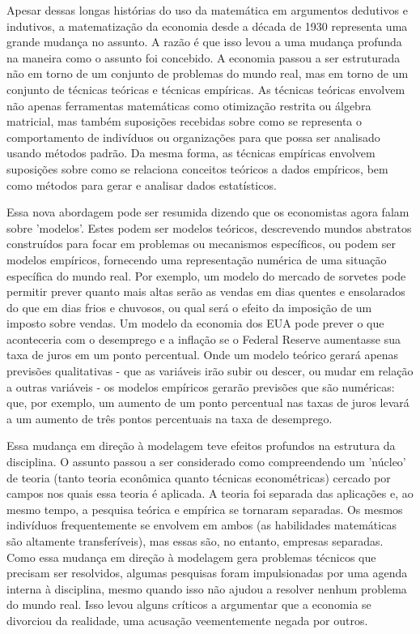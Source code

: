 \documentclass[12pt]{article}
\begin{document}
Apesar dessas longas histórias do uso da matemática em argumentos dedutivos e indutivos, a matematização da economia desde a década de 1930 representa uma grande mudança no assunto. A razão é que isso levou a uma mudança profunda na maneira como o assunto foi concebido. A economia passou a ser estruturada não em torno de um conjunto de problemas do mundo real, mas em torno de um conjunto de técnicas teóricas e técnicas empíricas. As técnicas teóricas envolvem não apenas ferramentas matemáticas como otimização restrita ou álgebra matricial, mas também suposições recebidas sobre como se representa o comportamento de indivíduos ou organizações para que possa ser analisado usando métodos padrão. Da mesma forma, as técnicas empíricas envolvem suposições sobre como se relaciona conceitos teóricos a dados empíricos, bem como métodos para gerar e analisar dados estatísticos.

Essa nova abordagem pode ser resumida dizendo que os economistas agora falam sobre 'modelos'. Estes podem ser modelos teóricos, descrevendo mundos abstratos construídos para focar em problemas ou mecanismos específicos, ou podem ser modelos empíricos, fornecendo uma representação numérica de uma situação específica do mundo real. Por exemplo, um modelo do mercado de sorvetes pode permitir prever quanto mais altas serão as vendas em dias quentes e ensolarados do que em dias frios e chuvosos, ou qual será o efeito da imposição de um imposto sobre vendas. Um modelo da economia dos EUA pode prever o que aconteceria com o desemprego e a inflação se o Federal Reserve aumentasse sua taxa de juros em um ponto percentual. Onde um modelo teórico gerará apenas previsões qualitativas - que as variáveis irão subir ou descer, ou mudar em relação a outras variáveis - os modelos empíricos gerarão previsões que são numéricas: que, por exemplo, um aumento de um ponto percentual nas taxas de juros levará a um aumento de três pontos percentuais na taxa de desemprego.

Essa mudança em direção à modelagem teve efeitos profundos na estrutura da disciplina. O assunto passou a ser considerado como compreendendo um 'núcleo' de teoria (tanto teoria econômica quanto técnicas econométricas) cercado por campos nos quais essa teoria é aplicada. A teoria foi separada das aplicações e, ao mesmo tempo, a pesquisa teórica e empírica se tornaram separadas. Os mesmos indivíduos frequentemente se envolvem em ambos (as habilidades matemáticas são altamente transferíveis), mas essas são, no entanto, empresas separadas. Como essa mudança em direção à modelagem gera problemas técnicos que precisam ser resolvidos, algumas pesquisas foram impulsionadas por uma agenda interna à disciplina, mesmo quando isso não ajudou a resolver nenhum problema do mundo real. Isso levou alguns críticos a argumentar que a economia se divorciou da realidade, uma acusação veementemente negada por outros.
\end{document}
